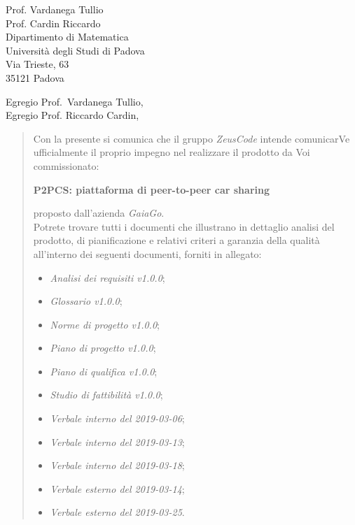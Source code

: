 \begin{letter}{
		Prof. Vardanega Tullio \\
		Prof. Cardin Riccardo \\
		Dipartimento di Matematica \\
		Università degli Studi di Padova \\
		Via Trieste, 63 \\
		35121 Padova}
		
\opening{Egregio Prof.~Vardanega Tullio,\\Egregio Prof. Riccardo Cardin,}

\begin{quotation}
Con la presente si comunica che il gruppo \textit{ZeusCode} intende 
comunicarVe ufficialmente il proprio impegno nel realizzare il prodotto da Voi 
commissionato:

\begin{center}
	\textbf{P2PCS: piattaforma di peer-to-peer car sharing}
\end{center}

\noindent proposto dall'azienda \textit{GaiaGo}.\\
Potrete trovare tutti i documenti che illustrano in dettaglio analisi del prodotto, di pianificazione e relativi criteri a garanzia della qualità all'interno dei seguenti 
documenti, forniti in allegato:

\begin{itemize}
	\item \textit{Analisi dei requisiti v1.0.0};
	
	\item \textit{Glossario v1.0.0};
	
	\item \textit{Norme di progetto v1.0.0};

	\item \textit{Piano di progetto v1.0.0};

	\item \textit{Piano di qualifica v1.0.0};

	\item \textit{Studio di fattibilità v1.0.0};

	\item \textit{Verbale interno del 2019-03-06};
	\item \textit{Verbale interno del 2019-03-13};
	\item \textit{Verbale interno del 2019-03-18};
	
	\item \textit{Verbale esterno del 2019-03-14};
	\item \textit{Verbale esterno del 2019-03-25}.
\end{itemize}


\end{quotation}
\end{letter}
